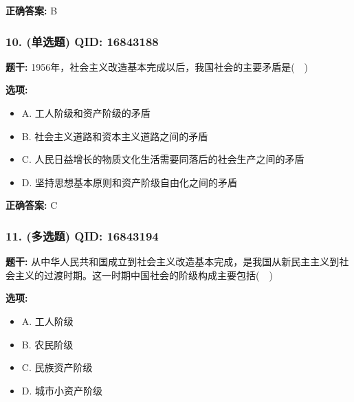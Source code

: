 \documentclass[12pt,UTF8]{ctexart}
\begin{document}
\textbf{正确答案:}
B

\vspace{0.3em}\hrulefill\vspace{0.7em}

\subsubsection*{10. (单选题) \small QID: 16843188}

\textbf{题干:}
1956年，社会主义改造基本完成以后，我国社会的主要矛盾是(  )

\textbf{选项:}
\begin{itemize}[leftmargin=*]

  \item A. 工人阶级和资产阶级的矛盾

  \item B. 社会主义道路和资本主义道路之间的矛盾

  \item C. 人民日益增长的物质文化生活需要同落后的社会生产之间的矛盾

  \item D. 坚持思想基本原则和资产阶级自由化之间的矛盾

\end{itemize}

\textbf{正确答案:}
C

\vspace{0.3em}\hrulefill\vspace{0.7em}

\subsubsection*{11. (多选题) \small QID: 16843194}

\textbf{题干:}
从中华人民共和国成立到社会主义改造基本完成，是我国从新民主主义到社会主义的过渡时期。这一时期中国社会的阶级构成主要包括(  )

\textbf{选项:}
\begin{itemize}[leftmargin=*]

  \item A. 工人阶级

  \item B. 农民阶级

  \item C. 民族资产阶级

  \item D. 城市小资产阶级

\end{itemize}
\end{document}
